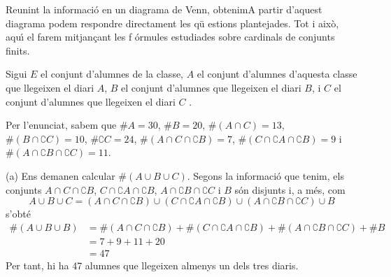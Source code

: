 \begin{solucio}
Reunint la informaci\'{o} en un diagrama de Venn, obtenimA partir d'aquest diagrama podem respondre directament les q\"{u}%
estions plantejades. Tot i aix\`{o}, aqu\'{\i} el farem mitjan\c{c}ant les f%
\'{o}rmules estudiades sobre cardinals de conjunts finits.

Sigui $E$ el conjunt d'alumnes de la classe, $A$ el conjunt d'alumnes
d'aquesta classe que llegeixen el diari $A$, $B$ el conjunt d'alumnes que
llegeixen el diari $B$, i $C$ el conjunt d'alumnes que llegeixen el diari $C$%
.

Per l'enunciat, sabem que $\#A=30$, $\#B=20$, $\#\left( A\cap C\right) =13$,
$\#\left( B\cap \complement C\right) =10$, $\#\complement C=24$, $\#\left(
A\cap C\cap \complement B\right) =7$, $\#\left( C\cap \complement A\cap
\complement B\right) =9$ i $\#\left( A\cap \complement B\cap \complement
C\right) =11$.

(a) Ens demanen calcular $\#\left( A\cup B\cup C\right) $. Segons la
informaci\'{o} que tenim, els conjunts $A\cap C\cap \complement B$, $C\cap
\complement A\cap \complement B$, $A\cap \complement B\cap \complement C$ i $%
B$ s\'{o}n disjunts i, a m\'{e}s, com%
\begin{equation*}
A\cup B\cup C=\left( A\cap C\cap \complement B\right) \cup \left( C\cap
\complement A\cap \complement B\right) \cup \left( A\cap \complement B\cap
\complement C\right) \cup B
\end{equation*}%
s'obt\'{e}%
\begin{align*}
\#\left( A\cup B\cup B\right) & =\#\left( A\cap C\cap \complement B\right)
+\#\left( C\cap \complement A\cap \complement B\right) +\#\left( A\cap
\complement B\cap \complement C\right) +\#B \\
& =7+9+11+20 \\
& =47
\end{align*}%
Per tant, hi ha 47 alumnes que llegeixen almenys un dels tres diaris.


\end{solucio}
